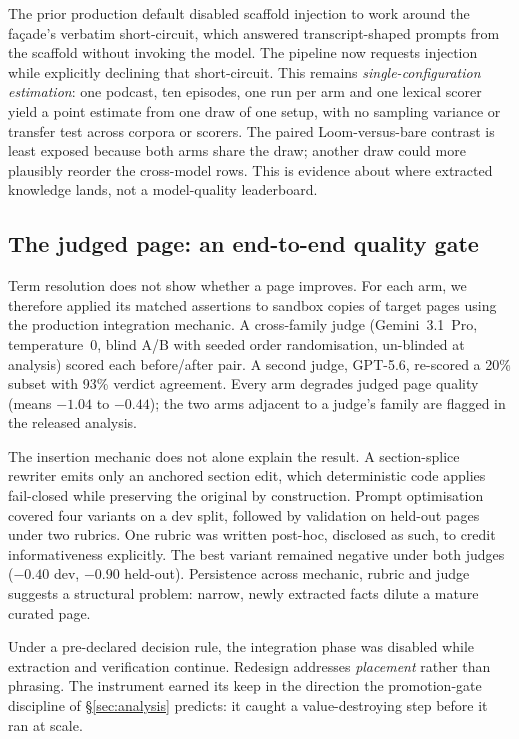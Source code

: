 \documentclass[10pt,twocolumn]{article}
\begin{document}


The prior production default disabled scaffold injection to work around the fa\c{c}ade's
verbatim short-circuit, which answered transcript-shaped prompts from the scaffold without
invoking the model. The pipeline now requests injection while explicitly declining that
short-circuit. This remains \emph{single-configuration estimation}: one podcast, ten episodes,
one run per arm and one lexical scorer yield a point estimate from one draw of one setup, with
no sampling variance or transfer test across corpora or scorers. The paired Loom-versus-bare
contrast is least exposed because both arms share the draw; another draw could more plausibly
reorder the cross-model rows. This is evidence about where extracted knowledge lands, not a
model-quality leaderboard.

\subsection{The judged page: an end-to-end quality gate}\label{sec:pagejudge}
Term resolution does not show whether a page improves. For each arm, we therefore applied its
matched assertions to sandbox copies of target pages using the production integration mechanic.
A cross-family judge (Gemini~3.1~Pro, temperature~0, blind A/B with seeded order randomisation,
un-blinded at analysis) scored each before/after pair. A second judge, GPT-5.6, re-scored a
20\% subset with 93\% verdict agreement. Every arm degrades judged page quality (means $-1.04$
to $-0.44$); the two arms adjacent to a judge's family are flagged in the released analysis.

The insertion mechanic does not alone explain the result. A section-splice rewriter emits only
an anchored section edit, which deterministic code applies fail-closed while preserving the
original by construction. Prompt optimisation covered four variants on a dev split, followed
by validation on held-out pages under two rubrics. One rubric was written post-hoc, disclosed
as such, to credit informativeness explicitly. The best variant remained negative under both
judges ($-0.40$ dev, $-0.90$ held-out). Persistence across mechanic, rubric and judge suggests
a structural problem: narrow, newly extracted facts dilute a mature curated page.

Under a pre-declared decision rule, the integration phase was disabled while extraction and
verification continue. Redesign addresses \emph{placement} rather than phrasing. The
instrument earned its keep in the direction the promotion-gate discipline
of \S\ref{sec:analysis} predicts: it caught a value-destroying step before it ran at scale.
\end{document}
